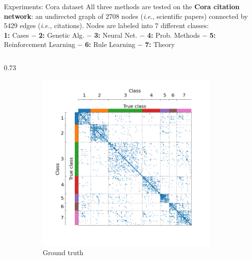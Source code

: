 \documentclass[final]{beamer}
\newlength{\colwidth}
\begin{document}
\begin{frame}[t]
\begin{columns}[t]
\begin{column}{\colwidth}
      \begin{block}{Experiments: Cora dataset}
        All three methods are tested on the \textbf{Cora citation network}: an undirected graph of 2708 nodes (\textit{i.e.}, scientific papers) connected by 5429 edges (\textit{i.e.}, citations). Nodes are labeled into 7 different classes:\\
        {\small \centering \textbf{1:} Cases $-$ \textbf{2:} Genetic Alg. $-$ \textbf{3:} Neural Net. $-$ \textbf{4:} Prob. Methods $-$ \textbf{5:} Reinforcement Learning $-$ \textbf{6:} Rule Learning $-$ \textbf{7:} Theory}
        \begin{column}{0.73\colwidth}
          \begin{figure}[H]
            \centering
            \hfill
            \begin{subfigure}{0.45\linewidth}
              \centering
              \includegraphics[width=\linewidth, trim={45 25 35 40}, clip]{figures/cora_gt.png}
              \caption{Ground truth
              }
              \label{fig:cora_gt}
            \end{subfigure}
            \hspace{0.5em}
            \begin{subfigure}{0.45\linewidth}
              \centering

\end{subfigure}
\end{figure}
\end{column}
\end{block}
\end{column}
\end{columns}
\end{frame}
\end{document}
